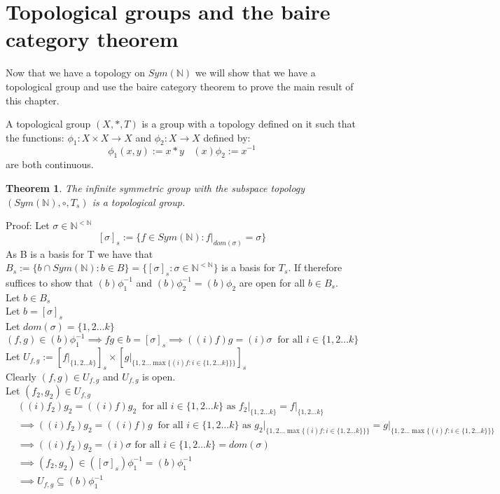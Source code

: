 \documentclass{report}
\newtheorem{theorem}{Theorem}[section]
\newenvironment{defn}[1][]{\refstepcounter{theorem}\begin{trivlist}
\item[\hskip \labelsep {\bfseries Definition  \thetheorem  \, \def\temp{#1}\ifx\temp\empty  #1\else  (#1)\fi
}]}   {\end{trivlist}}
\begin{document}
\section{Topological groups and the baire category theorem}
Now that we have a topology on $Sym(\mathbb{N})$ we will show that we have a topological group and use the baire category theorem to prove the main result of this chapter.
\begin{defn}
A topological group $(X,*,T)$ is a group with a topology defined on it such that the functions: $\phi_1:X\times X \rightarrow X$ and $\phi_2:X \rightarrow X$ defined by:
\[\phi_1(x,y) := x*y \ \ \ \ (x)\phi_2 := x^{-1}\]
are both continuous.
\end{defn}
\begin{theorem}
The infinite symmetric group with the subspace topology $(Sym(\mathbb{N}),\circ,T_s)$ is a topological group.
\end{theorem}\par
Proof: Let $\sigma \in \mathbb{N}^{<\mathbb{N}}$
\[[\sigma]_s := \{f\in Sym(\mathbb{N}) : f\vert_{dom(\sigma)} = \sigma\}\]
As B is a basis for T we have that $B_s :=\{ b \cap Sym(\mathbb{N}):b \in B \}= \{[\sigma]_s:\sigma \in \mathbb{N}^{<\mathbb{N}}\}$ is a basis for $T_s$.
If therefore suffices to show that $(b)\phi_1^{-1}$ and $(b)\phi_2^{-1}=(b)\phi_2$ are open for all $b \in B_s$.\\
Let $b\in B_s$\\
Let $b=[\sigma]_s$\\
Let $dom(\sigma) = \{1,2\ldots k\}$
\[(f,g)\in (b)\phi_1^{-1} \implies fg\in b=[\sigma]_s \implies ((i)f)g = (i)\sigma\ \text{  for all } i\in \{1,2 \ldots k\}
\]
Let $U_{f,g} := [f\vert_{\{1,2 \ldots k\}}]_s\times[g\vert_{\{1,2 \ldots \max\{(i)f:i\in \{1,2 \ldots k\}\}\}}]_s$\\
Clearly $(f,g)\in U_{f,g}$ and $U_{f,g}$ is open.\\
Let $(f_2,g_2)\in U_{f,g}$
\begin{align*}
&((i)f_2)g_2 = ((i)f)g_2\ \text{  for all } i \in \{1,2 \ldots k\}\text{ as }f_2\vert_{\{1,2 \ldots k\}}=f\vert_{\{1,2 \ldots k\}}\\
&\implies ((i)f_2)g_2 = ((i)f)g\ \text{ for all } i \in \{1,2 \ldots k\} \text{ as }g_2\vert_{\{1,2 \ldots \max\{(i)f:i\in \{1,2 \ldots k\}\}\}}=g\vert_{\{1,2\ldots \max\{(i)f:i\in \{1,2 \ldots k\}\}\}}\\
&\implies ((i)f_2)g_2=(i)\sigma \text{  for all } i \in \{1,2 \ldots k\}=dom(\sigma)\\
&\implies (f_2,g_2)\in ([\sigma]_s)\phi_1^{-1}=(b)\phi_1^{-1}\\
&\implies U_{f,g}\subseteq (b)\phi_1^{-1}
\end{align*}
\end{document}
